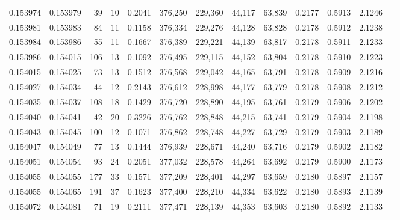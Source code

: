 \begin{tabular}{rrrrrrrrrrrrr}
0.153974 & 0.153979 &    39 &  10 &                                     0.2041 & 376,250 & 229,360 &  44,117 &  63,839 & 0.2177 & 0.5913 & 2.1246 \\
0.153981 & 0.153983 &    84 &  11 &                                     0.1158 & 376,334 & 229,276 &  44,128 &  63,828 & 0.2178 & 0.5912 & 2.1238 \\
0.153984 & 0.153986 &    55 &  11 &                                     0.1667 & 376,389 & 229,221 &  44,139 &  63,817 & 0.2178 & 0.5911 & 2.1233 \\
0.153986 & 0.154015 &   106 &  13 &                                     0.1092 & 376,495 & 229,115 &  44,152 &  63,804 & 0.2178 & 0.5910 & 2.1223 \\
0.154015 & 0.154025 &    73 &  13 &                                     0.1512 & 376,568 & 229,042 &  44,165 &  63,791 & 0.2178 & 0.5909 & 2.1216 \\
0.154027 & 0.154034 &    44 &  12 &                                     0.2143 & 376,612 & 228,998 &  44,177 &  63,779 & 0.2178 & 0.5908 & 2.1212 \\
0.154035 & 0.154037 &   108 &  18 &                                     0.1429 & 376,720 & 228,890 &  44,195 &  63,761 & 0.2179 & 0.5906 & 2.1202 \\
0.154040 & 0.154041 &    42 &  20 &                                     0.3226 & 376,762 & 228,848 &  44,215 &  63,741 & 0.2179 & 0.5904 & 2.1198 \\
0.154043 & 0.154045 &   100 &  12 &                                     0.1071 & 376,862 & 228,748 &  44,227 &  63,729 & 0.2179 & 0.5903 & 2.1189 \\
0.154047 & 0.154049 &    77 &  13 &                                     0.1444 & 376,939 & 228,671 &  44,240 &  63,716 & 0.2179 & 0.5902 & 2.1182 \\
0.154051 & 0.154054 &    93 &  24 &                                     0.2051 & 377,032 & 228,578 &  44,264 &  63,692 & 0.2179 & 0.5900 & 2.1173 \\
0.154055 & 0.154055 &   177 &  33 &                                     0.1571 & 377,209 & 228,401 &  44,297 &  63,659 & 0.2180 & 0.5897 & 2.1157 \\
0.154055 & 0.154065 &   191 &  37 &                                     0.1623 & 377,400 & 228,210 &  44,334 &  63,622 & 0.2180 & 0.5893 & 2.1139 \\
0.154072 & 0.154081 &    71 &  19 &                                     0.2111 & 377,471 & 228,139 &  44,353 &  63,603 & 0.2180 & 0.5892 & 2.1133 \\

\end{tabular}

